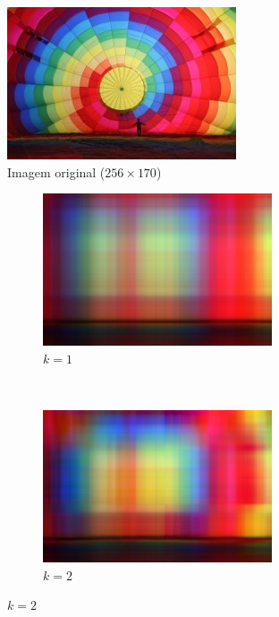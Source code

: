 \documentclass[brazil,times]{abnt}
\begin{document}
	\begin{figure}[hb]
		\centering
		\includegraphics[scale=1]{imagens/balloon256.jpg}
		\caption[Imagem original] {Imagem original ($256 \times 170$)}
	\end{figure}
	
	\begin{figure}
        \centering
        \begin{subfigure}[b]{0.5\textwidth}
                \centering
                \includegraphics[width=\textwidth]{imagens/balloon256-compressed-1.jpg}
                \caption{$k = 1$}
        \end{subfigure}%
        ~ %
        \begin{subfigure}[b]{0.5\textwidth}
                \centering
                \includegraphics[width=\textwidth]{imagens/balloon256-compressed-2.jpg}
                \caption{$k = 2$}
        \end{subfigure}


\end{figure}
\end{document}
